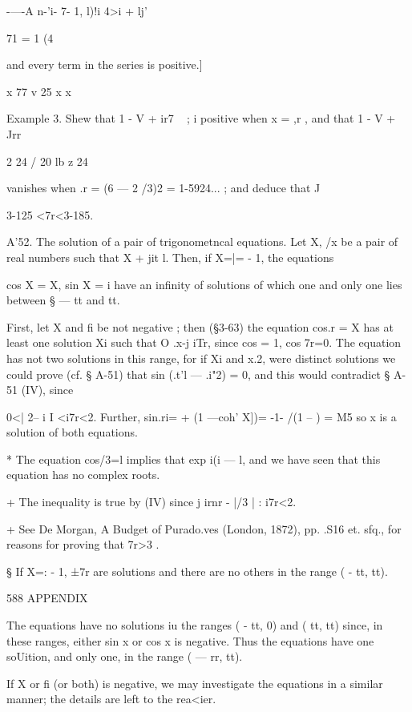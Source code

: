 -—-A n-'i- 7- 1, 
l)!i 4>i + lj' 



71 = 1 (4  

and every term in the series is positive.] 

x  77  v  25 x  x  

Example 3. Shew that 1 - V + ir7 ~ ;  i  positive when x = ,r , and that 1 - V + Jrr 

2 24 / 20 lb z 24 

vanishes when .r = (6 — 2  /3)2 = 1-5924... ; and deduce that J 

3-125 <7r<3-185. 

A'52. The solution of a pair of trigonometncal equations. 
Let X, /x be a pair of real numbers such that X  + jit l. 
Then, if X=|= - 1, the equations 

cos X = X, sin X =  i 
have an infinity of solutions of which one and only one lies between § — tt and tt. 

First, let X and fi be not negative ; then (§3-63) the equation cos.r = X has at least one 
solution Xi such that O .x-j iTr, since cos = 1, cos 7r=0. The equation has not two 
solutions in this range, for if Xi and x.2, were distinct solutions we could prove (cf. § A-51) 
that sin (.t'l — .i"2) = 0, and this would contradict § A-51 (IV), since 

0<| 2-- i I <i7r<2. 
Further, sin.ri= + (1 —coh'  X])= -1- /(1 -- ) = M5 so x  is a solution of both equations. 

* The equation cos/3=l implies that exp i(i — l, and we have seen that this equation has no 
complex roots. 

+ The inequality is true by (IV) since   j irnr - |/3 | :  i7r<2. 

+ See De Morgan, A Budget of Purado.ves (London, 1872), pp. .S16 et. sfq., for reasons for 
proving that 7r>3 . 

§ If X=: - 1, ±7r are solutions and there are no others in the range ( - tt, tt). 



588 APPENDIX 

The equations have no solutions iu the ranges ( - tt, 0) and ( tt, tt) since, in these 
ranges, either sin x or cos x is negative. Thus the equations have one soUition, and only 
one, in the range ( — rr, tt). 

If X or fi (or both) is negative, we may investigate the equations in a similar manner; 
the details are left to the rea<ier. 

